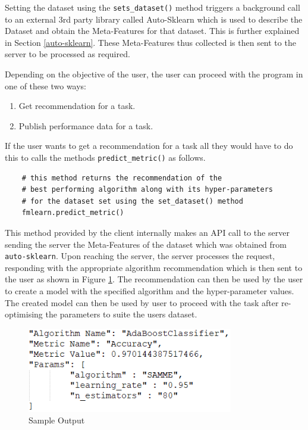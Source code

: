 Setting the dataset using the \texttt{sets\_dataset()} method triggers a background call to an external 3rd party library called Auto-Sklearn which is used to describe the Dataset and obtain the Meta-Features for that dataset. This is further explained in Section \ref{auto-sklearn}. These Meta-Features thus collected is then sent to the server to be processed as required.

Depending on the objective of the user, the user can proceed with the program in one of these two ways:
\begin{enumerate}
    \item Get recommendation for a task.
    \item Publish performance data for a task.
\end{enumerate}
If the user wants to get a recommendation for a task all they would have to do this to calls the methods \texttt{predict\_metric()} as follows.

\begin{lstlisting}
    # this method returns the recommendation of the
    # best performing algorithm along with its hyper-parameters
    # for the dataset set using the set_dataset() method
    fmlearn.predict_metric()
\end{lstlisting}

This method provided by the client internally makes an API call to the server sending the server the Meta-Features of the dataset which was obtained from \texttt{auto-sklearn}. Upon reaching the server, the server processes the request, responding with the appropriate algorithm recommendation which is then sent to the user as shown in Figure \ref{sample-output}. The recommendation can then be used by the user to create a model with the specified algorithm and the hyper-parameter values. The created model can then be used by user to proceed with the task after re-optimising the parameters to suite the users dataset.

\begin{figure}[H]
    \centering
    \includegraphics[width=9cm]{images/sample-output.png}
    \caption{Sample Output}
    \label{sample-output}
\end{figure}

